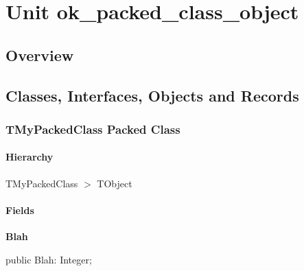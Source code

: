 \documentclass{report}
\newif\ifpdf
\begin{document}
\label{toc}\tableofcontents
\newpage
\newlength{\tmplength}
\chapter{Unit ok{\_}packed{\_}class{\_}object}
\label{ok_packed_class_object}
\section{Overview}
\begin{description}
\item[\texttt{\begin{ttfamily}TMyPackedClass\end{ttfamily} Packed Class}]
\item[\texttt{\begin{ttfamily}TMyPackedObject\end{ttfamily} Packed Object}]
\end{description}
\section{Classes, Interfaces, Objects and Records}
\ifpdf
\subsection*{\large{\textbf{TMyPackedClass Packed Class}}\normalsize\hspace{1ex}\hrulefill}
\else
\subsection*{TMyPackedClass Packed Class}
\fi
\label{ok_packed_class_object.TMyPackedClass}
\subsubsection*{\large{\textbf{Hierarchy}}\normalsize\hspace{1ex}\hfill}
TMyPackedClass {$>$} TObject
\subsubsection*{\large{\textbf{Fields}}\normalsize\hspace{1ex}\hfill}
\begin{list}{}{
\setlength{\itemindent}{0cm}
\setlength{\listparindent}{0cm}
\setlength{\leftmargin}{\evensidemargin}
\addtolength{\leftmargin}{\tmplength}
\settowidth{\labelsep}{X}
\addtolength{\leftmargin}{\labelsep}
\setlength{\labelwidth}{\tmplength}
}
\label{ok_packed_class_object.TMyPackedClass-Blah}
\item[\textbf{Blah}\hfill]
\ifpdf
\begin{flushleft}
\fi
\begin{ttfamily}
public Blah: Integer;\end{ttfamily}

\ifpdf
\end{flushleft}
\fi


\par  \end{list}
\ifpdf
\end{document}
